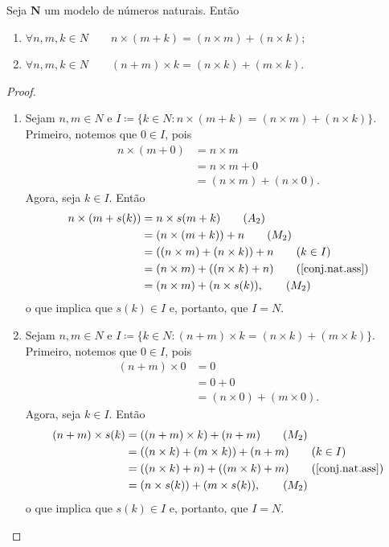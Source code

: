 \begin{teo}[Distributividade] \label{conj.nat.dist}
	Seja $\bm N$ um modelo de números naturais. Então
	\begin{enumerate}
	\item $\forall n,m,k \in N \qquad n \times (m+k) = (n \times m) + (n \times k)$;
	\item $\forall n,m,k \in N \qquad (n + m) \times k = (n \times k) + (m \times k)$.
	\end{enumerate}
\end{teo}
\begin{proof}
	\begin{enumerate}
	\item Sejam $n,m \in N$ e $I \coloneqq \{k \in N:n \times (m+k) = (n \times m) + (n \times k)\}$. Primeiro, notemos que $0 \in I$, pois
	\begin{align*}
	n \times (m+0) &= n \times m 								\tag{$A_1$} \\
		&= n \times m  + 0 											\tag{$A_1$} \\
		&= (n \times m) + (n \times 0).							\tag{$M_1$}
	\end{align*}
Agora, seja $k \in I$. Então
	\begin{align*}
	n \times (m+s(k)) &= n \times s(m+k) 					\tag{$A_2$}\\
		&= (n \times (m+k)) + n 									\tag{$M_2$}\\
		&= ((n \times m) + (n \times k)) + n					\tag{$k \in I$} \\
		&= (n \times m) + ((n \times k) + n)				 	\tag{$\ref{conj.nat.ass}$} \\
		&= (n \times m) + (n \times s(k)),						\tag{$M_2$}
	\end{align*}
o que implica que $s(k) \in I$ e, portanto, que $I=N$.

	\item Sejam $n,m \in N$ e $I \coloneqq \{k \in N:(n + m) \times k = (n \times k) + (m \times k)\}$. Primeiro, notemos que $0 \in I$, pois
	\begin{align*}
	(n + m) \times 0 &= 0 											\tag{$M_1$} \\
		&= 0 + 0															\tag{$A_1$} \\
		&= (n \times 0) + (m \times 0).							\tag{$M_1$}
	\end{align*}
Agora, seja $k \in I$. Então	
	\begin{align*}
	(n + m) \times s(k) &= ((n+m) \times k) + (n+m)	\tag{$M_2$}\\
		&= ((n \times k) + (m \times k)) + (n+m)			\tag{$k \in I$}\\
		&= ((n \times k)+n) + ((m \times k)+m)			\tag{\ref{conj.nat.ass}} \\
		&= (n \times s(k)) + (m \times s(k)),				 	\tag{$M_2$}
	\end{align*}
o que implica que $s(k) \in I$ e, portanto, que $I=N$.
	\end{enumerate}
\end{proof}

